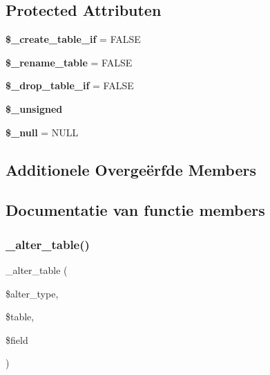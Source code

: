 \subsection*{Protected Attributen}
\begin{DoxyCompactItemize}
\item 
\mbox{\label{class_c_i___d_b__ibase__forge_a2f6484fcb8d1dc3eef67a637227cd583}} 
{\bfseries \$\+\_\+create\+\_\+table\+\_\+if} = F\+A\+L\+SE
\item 
\mbox{\label{class_c_i___d_b__ibase__forge_a1a649e7cf9de16bcf932977b18bc91de}} 
{\bfseries \$\+\_\+rename\+\_\+table} = F\+A\+L\+SE
\item 
\mbox{\label{class_c_i___d_b__ibase__forge_a92a8a9145a7fc91e252e58d019373581}} 
{\bfseries \$\+\_\+drop\+\_\+table\+\_\+if} = F\+A\+L\+SE
\item 
{\bfseries \$\+\_\+unsigned}
\item 
\mbox{\label{class_c_i___d_b__ibase__forge_ae58fe6a5104d4a069a49b27533ce808f}} 
{\bfseries \$\+\_\+null} = \textquotesingle{}N\+U\+LL\textquotesingle{}
\end{DoxyCompactItemize}
\subsection*{Additionele Overge\"{e}rfde Members}


\subsection{Documentatie van functie members}
\mbox{\label{class_c_i___d_b__ibase__forge_a41c6cae02f2fda8b429ad0afb9509426}} 
\subsubsection{\texorpdfstring{\_alter\_table()}{\_alter\_table()}}
{\footnotesize\ttfamily \+\_\+alter\+\_\+table (\begin{DoxyParamCaption}\item[{}]{\$alter\+\_\+type,  }\item[{}]{\$table,  }\item[{}]{\$field }\end{DoxyParamCaption})\hspace{0.3cm}{\ttfamily [protected]}}

